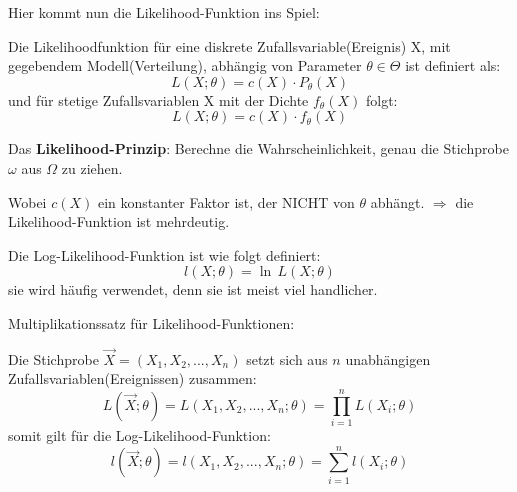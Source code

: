 Hier kommt nun die Likelihood-Funktion ins Spiel:
\begin{definition}Die Likelihoodfunktion für eine diskrete Zufallsvariable(Ereignis) X, mit gegebendem Modell(Verteilung), abhängig von Parameter $\theta\in\Theta$ ist definiert als:\label{def:likelihoodfunktion}
\[L(X;\theta)=c(X)\cdot P_\theta(X)\]
und für stetige Zufallsvariablen X mit der Dichte $f_\theta(X)$ folgt:
\[L(X;\theta)=c(X)\cdot f_\theta(X)\]
\end{definition}
Das \textbf{Likelihood-Prinzip}: Berechne die Wahrscheinlichkeit, genau die Stichprobe $\omega$ aus $\Omega$ zu ziehen.

Wobei $c(X)$ ein konstanter Faktor ist, der NICHT von $\theta$ abhängt. $\Rightarrow$ die Likelihood-Funktion ist mehrdeutig.

\begin{definition}
Die Log-Likelihood-Funktion ist wie folgt definiert:
\[l(X;\theta)=\ln\,L(X;\theta)\]
sie wird häufig verwendet, denn sie ist meist viel handlicher.
\end{definition}

\begin{definition}Multiplikationssatz für Likelihood-Funktionen:\label{def:multiplikationssatz_likelihood}

Die Stichprobe $\vec X=(X_1, X_2, ..., X_n)$ setzt sich aus $n$ unabhängigen Zufallsvariablen(Ereignissen) zusammen:
    \[L(\vec X;\theta) = L(X_1, X_2, ..., X_n;\theta) = \prod_{i=1}^nL(X_i;\theta)\]
somit gilt für die Log-Likelihood-Funktion:
    \[l(\vec X;\theta) = l(X_1, X_2, ..., X_n;\theta) = \sum_{i=1}^nl(X_i;\theta)\]
\end{definition}

